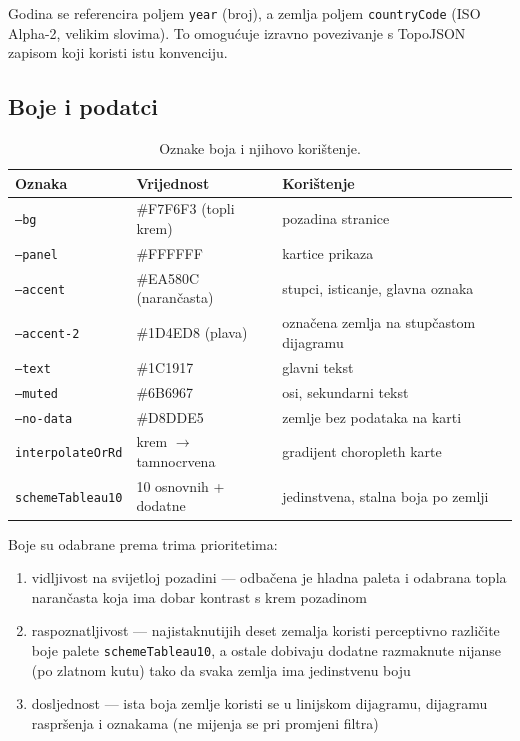 \documentclass[a4paper,11pt]{article}
\begin{document}
Godina se referencira poljem \texttt{year} (broj), a zemlja poljem \texttt{countryCode} (ISO Alpha-2, velikim slovima). To omogućuje izravno povezivanje s TopoJSON zapisom koji koristi istu konvenciju.

\subsection{Boje i podatci}

\begin{table}[H]
\centering
\small
\begin{tabular}{p{3.5cm}p{4cm}p{6cm}}
\toprule
\textbf{Oznaka} & \textbf{Vrijednost} & \textbf{Korištenje} \\
\midrule
\texttt{--bg} & \#F7F6F3 (topli krem) & pozadina stranice \\
\texttt{--panel} & \#FFFFFF & kartice prikaza \\
\texttt{--accent} & \#EA580C (narančasta) & stupci, isticanje, glavna oznaka \\
\texttt{--accent-2} & \#1D4ED8 (plava) & označena zemlja na stupčastom dijagramu \\
\texttt{--text} & \#1C1917 & glavni tekst \\
\texttt{--muted} & \#6B6967 & osi, sekundarni tekst \\
\texttt{--no-data} & \#D8DDE5 & zemlje bez podataka na karti \\
\texttt{interpolateOrRd} & krem $\to$ tamnocrvena & gradijent choropleth karte \\
\texttt{schemeTableau10} & 10 osnovnih + dodatne & jedinstvena, stalna boja po zemlji \\
\bottomrule
\end{tabular}
\caption{Oznake boja i njihovo korištenje.}
\end{table}

Boje su odabrane prema trima prioritetima:

\begin{enumerate}
  \item vidljivost na svijetloj pozadini --- odbačena je hladna paleta i odabrana topla narančasta koja ima dobar kontrast s krem pozadinom
  \item raspoznatljivost --- najistaknutijih deset zemalja koristi perceptivno različite boje palete \texttt{schemeTableau10}, a ostale dobivaju dodatne razmaknute nijanse (po zlatnom kutu) tako da svaka zemlja ima jedinstvenu boju
  \item dosljednost --- ista boja zemlje koristi se u linijskom dijagramu, dijagramu raspršenja i oznakama (ne mijenja se pri promjeni filtra)
\end{enumerate}
\end{document}
